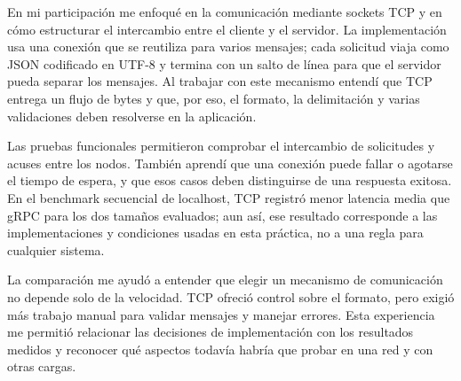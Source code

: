 En mi participación me enfoqué en la comunicación mediante sockets TCP y en cómo estructurar el intercambio entre el cliente y el servidor. La implementación usa una conexión que se reutiliza para varios mensajes; cada solicitud viaja como JSON codificado en UTF-8 y termina con un salto de línea para que el servidor pueda separar los mensajes. Al trabajar con este mecanismo entendí que TCP entrega un flujo de bytes y que, por eso, el formato, la delimitación y varias validaciones deben resolverse en la aplicación.

Las pruebas funcionales permitieron comprobar el intercambio de solicitudes y acuses entre los nodos. También aprendí que una conexión puede fallar o agotarse el tiempo de espera, y que esos casos deben distinguirse de una respuesta exitosa. En el benchmark secuencial de localhost, TCP registró menor latencia media que gRPC para los dos tamaños evaluados; aun así, ese resultado corresponde a las implementaciones y condiciones usadas en esta práctica, no a una regla para cualquier sistema.

La comparación me ayudó a entender que elegir un mecanismo de comunicación no depende solo de la velocidad. TCP ofreció control sobre el formato, pero exigió más trabajo manual para validar mensajes y manejar errores. Esta experiencia me permitió relacionar las decisiones de implementación con los resultados medidos y reconocer qué aspectos todavía habría que probar en una red y con otras cargas.